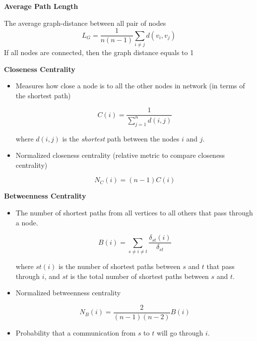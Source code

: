 \textbf{Average Path Length}

The average graph-distance between all pair of nodes
\begin{equation*}
    L_{G} =\frac{1}{n(n-1)}\sum _{i\neq j} d( v_{i} ,v_{j})
\end{equation*}
If all nodes are connected, then the graph distance equals to 1

\textbf{Closeness Centrality}
\begin{itemize}
    \item Measures how close a node is to all the other nodes in network (in terms of the shortest path)
          
          \begin{equation*}
              \boxed{C(i)=\frac{1}{\sum _{j=1}^{n} d(i,j)}}
          \end{equation*}
          
          where $d(i,j)$ is the \textit{shortest} path between the nodes $i$ and $j$.
    \item Normalized closeness centrality (relative metric to compare closeness centrality)
          
          \begin{equation*}
              \boxed{N_{C} (i)=(n-1)C(i)}
          \end{equation*}
\end{itemize}

\textbf{Betweenness Centrality}
\begin{itemize}
    \item The number of shortest paths from all vertices to all others that pass through a node.
          
          \begin{equation*}
              \boxed{B(i)=\sum _{s\neq i\neq t}\frac{\delta _{st} (i)}{\delta _{st}}}
          \end{equation*}
          
          where $st\left( i\right)$ is the number of shortest paths between $s$ and $t$ that pass through $i$, and $st$ is the total number of shortest paths between $s$ and $t$.
    \item Normalized betweenness centrality
          
          \begin{equation*}
              N_{B} (i)=\frac{2}{(n-1)(n-2)} B(i)
          \end{equation*}
    \item Probability that a communication from $s$ to $t$ will go through $i$.
\end{itemize}

